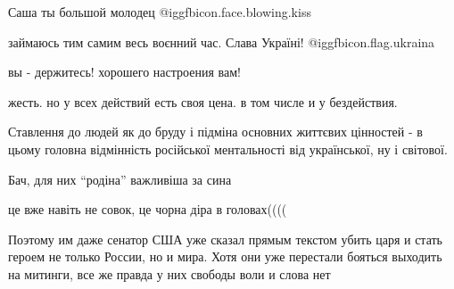  
 
 
 
 
\zzSecCmt

\begin{itemize} %
Саша ты большой молодец @igg{fbicon.face.blowing.kiss} 

займаюсь тим самим весь воєнний час. Слава Україні!  @igg{fbicon.flag.ukraina}

вы - держитесь! хорошего настроения вам!

жесть. но у всех действий есть своя цена. в том числе и у бездействия.


Ставлення до людей як до бруду і підміна основних життєвих цінностей - в цьому
головна відмінність російської ментальності від української, ну і світової.

Бач, для них \enquote{родіна} важливіша за сина

це вже навіть не совок, це чорна діра в головах((((


Поэтому им даже сенатор США уже сказал прямым текстом убить царя и стать героем
не только России, но и мира. Хотя они уже перестали бояться выходить на
митинги, все же правда у них свободы воли и слова нет

\end{itemize} %
